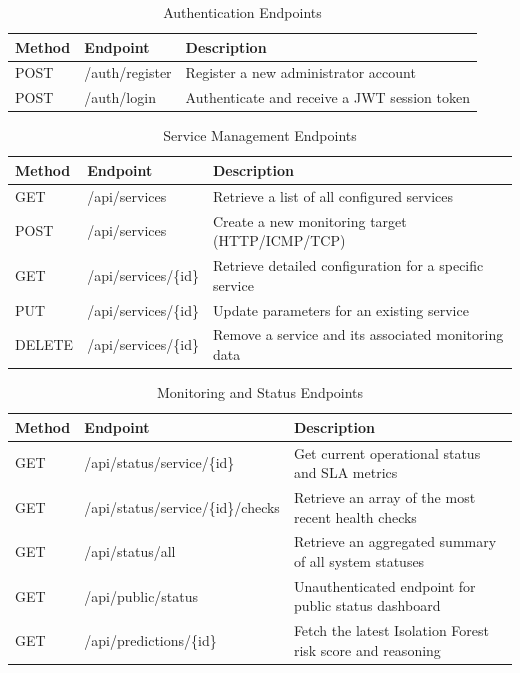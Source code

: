 \documentclass[12pt,a4paper,oneside]{report}
\begin{document}
\begin{table}[H]
\centering
\begin{tabularx}{\textwidth}{|l|l|X|}
\hline
\textbf{Method} & \textbf{Endpoint} & \textbf{Description} \\
\hline
POST & /auth/register & Register a new administrator account \\
\hline
POST & /auth/login & Authenticate and receive a JWT session token \\
\hline
\end{tabularx}
\caption{Authentication Endpoints}
\end{table}

\begin{table}[H]
\centering
\begin{tabularx}{\textwidth}{|l|l|X|}
\hline
\textbf{Method} & \textbf{Endpoint} & \textbf{Description} \\
\hline
GET & /api/services & Retrieve a list of all configured services \\
\hline
POST & /api/services & Create a new monitoring target (HTTP/ICMP/TCP) \\
\hline
GET & /api/services/\{id\} & Retrieve detailed configuration for a specific service \\
\hline
PUT & /api/services/\{id\} & Update parameters for an existing service \\
\hline
DELETE & /api/services/\{id\} & Remove a service and its associated monitoring data \\
\hline
\end{tabularx}
\caption{Service Management Endpoints}
\end{table}

\begin{table}[H]
\centering
\begin{tabularx}{\textwidth}{|l|l|X|}
\hline
\textbf{Method} & \textbf{Endpoint} & \textbf{Description} \\
\hline
GET & /api/status/service/\{id\} & Get current operational status and SLA metrics \\
\hline
GET & /api/status/service/\{id\}/checks & Retrieve an array of the most recent health checks \\
\hline
GET & /api/status/all & Retrieve an aggregated summary of all system statuses \\
\hline
GET & /api/public/status & Unauthenticated endpoint for public status dashboard \\
\hline
GET & /api/predictions/\{id\} & Fetch the latest Isolation Forest risk score and reasoning \\
\hline
\end{tabularx}
\caption{Monitoring and Status Endpoints}
\end{table}
\end{document}
